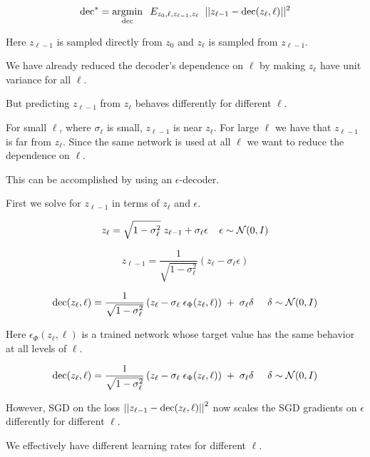 {$$\mathrm{dec}^* = \operatorname*{argmin}_{\mathrm{dec}}\;\;E_{z_0,\ell,z_{\ell-1},z_\ell} \;\;||z_{\ell-1} - \mathrm{dec}(z_\ell,\ell)||^2$$

\vfill
Here $z_{\ell-1}$ is sampled directly from $z_0$ and $z_\ell$ is sampled from $z_{\ell-1}$.


We have already reduced the decoder's dependence on $\ell$ by making $z_\ell$ have unit variance for all $\ell$.

\vfill
But predicting $z_{\ell-1}$ from $z_\ell$ behaves differently for different $\ell$.

\vfill
For small $\ell$, where $\sigma_\ell$ is small, $z_{\ell-1}$ is near $z_\ell$.
For large $\ell$ we have that $z_{\ell-1}$ is far from $z_\ell$.  Since the same network is used at all $\ell$ we want to reduce the dependence on $\ell$.

\vfill
This can be accomplished by using an $\epsilon$-decoder.


First we solve for $z_{\ell-1}$ in terms of $z_\ell$ and $\epsilon$.

$$z_\ell = \sqrt{1-\sigma^2_\ell}\;z_{\ell-1} + \sigma_\ell \epsilon\;\;\;\;\epsilon \sim {\cal N}(0,I)$$

\vfill
$$z_{\ell-1} = \frac{1}{\sqrt{1-\sigma_\ell^2}}(z_\ell - \sigma_\ell \epsilon)$$

\vfill
$$\mathrm{dec}(z_\ell,\ell) = \frac{1}{\sqrt{1-\sigma_\ell^2}}\left(z_\ell - \sigma_\ell\; \epsilon_\Phi(z_\ell,\ell)\right)\; +\; \sigma_\ell\delta\;\;\;\;\;\delta \sim {\cal N}(0,I)$$

\vfill
Here $\epsilon_\Phi(z_\ell,\ell)$ is a trained network whose target value has the same behavior at all levels of $\ell$.


$$\mathrm{dec}(z_\ell,\ell) = \frac{1}{\sqrt{1-\sigma_\ell^2}}\left(z_\ell - \sigma_\ell\; \epsilon_\Phi(z_\ell,\ell)\right)\; +\; \sigma_\ell\delta\;\;\;\;\;\delta \sim {\cal N}(0,I)$$

\vfill
However, SGD on the loss $\left|\left|z_{\ell-1} - \mathrm{dec}(z_\ell,\ell)\right|\right|^2$ now scales the SGD gradients on $\epsilon$ differently for different $\ell$.

\vfill
We effectively have different learning rates for different $\ell$.


}
